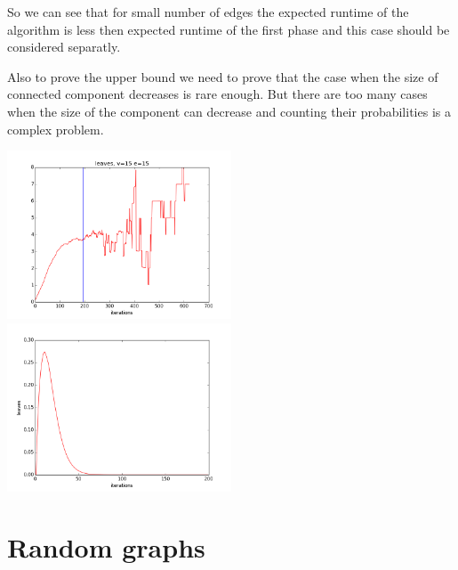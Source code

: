 \documentclass{llncs}
\begin{document}
  So we can see that for small number of edges the expected runtime of the algorithm is less then expected runtime of the first phase and this case should be considered separatly.
  
  Also to prove the upper bound we need to prove that the case when the size of connected component decreases is rare enough.
  But there are too many cases when the size of the component can decrease and counting their probabilities is a complex problem.
  
  
  \includegraphics[height=5cm]{pic/leaves_v15e15.png}
  \includegraphics[height=5cm]{pic/firstPart.png}
  
 \section{Random graphs}
 
 
 
\end{document}
